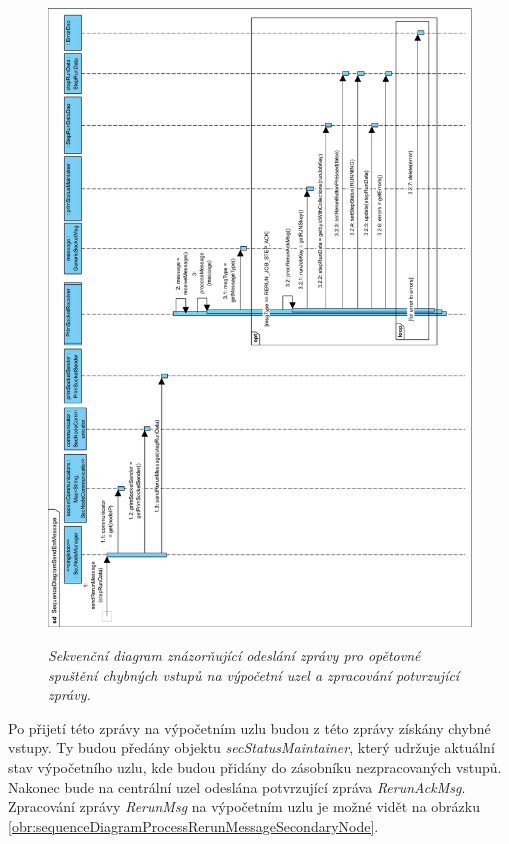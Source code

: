 \begin{figure}[H]
\begin{center}
    \scalebox{0.49}
    {
        \includegraphics{images/SequenceDiagramSendErrMessagePrimaryNode.pdf}
    }
    \caption{\label{obr:sequenceDiagramSendErrMessagePrimaryNode} {\it Sekvenční diagram  znázorňující odeslání zprávy pro opětovné spuštění chybných vstupů na výpočetní uzel a zpracování potvrzující zprávy.}}
\end{center}
\end{figure}

Po přijetí této zprávy na výpočetním uzlu budou z této zprávy získány chybné vstupy. Ty budou předány objektu \textit{secStatusMaintainer}, který udržuje aktuální stav výpočetního uzlu, kde budou přidány do zásobníku nezpracovaných vstupů. Nakonec bude na centrální uzel odeslána potvrzující zpráva \textit{RerunAckMsg}. Zpracování zprávy \textit{RerunMsg} na výpočetním uzlu je možné vidět na obrázku \ref{obr:sequenceDiagramProcessRerunMessageSecondaryNode}.

